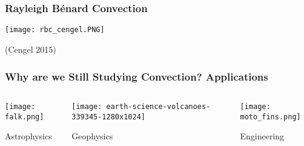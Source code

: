 \section{}%

\begin{frame}[fragile]
    \frametitle{Rayleigh B\'enard Convection}
    \begin{center}
        \texttt{[image: rbc\_cengel.PNG]}

        (Cengel 2015)
    \end{center}
\end{frame}

\begin{frame}[fragile]
    \frametitle{Why are we Still Studying Convection? \textbf{Applications}}
    \vfill
    \begin{columns}
        \begin{column}{.30\textwidth}
            \centering
            \texttt{[image: falk.png]}

            {Astrophysics}
        \end{column}

        \begin{column}{.3\textwidth}
            \centering
            \texttt{[image: earth-science-volcanoes-339345-1280x1024]}

            {Geophysics}
        \end{column}

        \begin{column}{.30\textwidth}
            \centering
            \texttt{[image: moto\_fins.png]}

            {Engineering}
        \end{column}
    \end{columns}
\end{frame}

